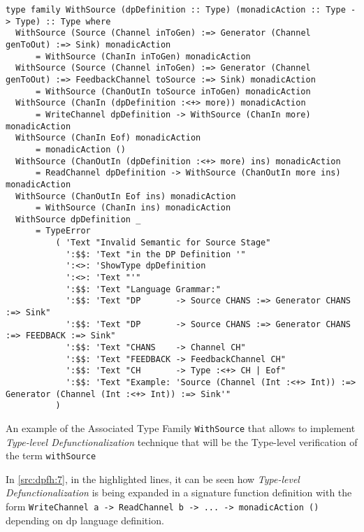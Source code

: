 \begin{listing}[H]
  \begin{verbatim}
type family WithSource (dpDefinition :: Type) (monadicAction :: Type -> Type) :: Type where
  WithSource (Source (Channel inToGen) :=> Generator (Channel genToOut) :=> Sink) monadicAction
      = WithSource (ChanIn inToGen) monadicAction
  WithSource (Source (Channel inToGen) :=> Generator (Channel genToOut) :=> FeedbackChannel toSource :=> Sink) monadicAction 
      = WithSource (ChanOutIn toSource inToGen) monadicAction
  WithSource (ChanIn (dpDefinition :<+> more)) monadicAction         
      = WriteChannel dpDefinition -> WithSource (ChanIn more) monadicAction
  WithSource (ChanIn Eof) monadicAction                              
      = monadicAction ()
  WithSource (ChanOutIn (dpDefinition :<+> more) ins) monadicAction  
      = ReadChannel dpDefinition -> WithSource (ChanOutIn more ins) monadicAction
  WithSource (ChanOutIn Eof ins) monadicAction                       
      = WithSource (ChanIn ins) monadicAction
  WithSource dpDefinition _                                          
      = TypeError
          ( 'Text "Invalid Semantic for Source Stage"
            ':$$: 'Text "in the DP Definition '"
            ':<>: 'ShowType dpDefinition
            ':<>: 'Text "'"
            ':$$: 'Text "Language Grammar:"
            ':$$: 'Text "DP       -> Source CHANS :=> Generator CHANS :=> Sink"
            ':$$: 'Text "DP       -> Source CHANS :=> Generator CHANS :=> FEEDBACK :=> Sink"
            ':$$: 'Text "CHANS    -> Channel CH"
            ':$$: 'Text "FEEDBACK -> FeedbackChannel CH"
            ':$$: 'Text "CH       -> Type :<+> CH | Eof"
            ':$$: 'Text "Example: 'Source (Channel (Int :<+> Int)) :=> Generator (Channel (Int :<+> Int)) :=> Sink'"
          )
  \end{verbatim}
  \caption[{[\texttt{Stage.hs}] WithSource Associate Type Details}]{An example of the Associated Type Family \texttt{WithSource} that allows to implement \emph{Type-level Defunctionalization} technique that will be the Type-level verification of the term \texttt{withSource}}
  \label{src:dpfh:7}
\end{listing}

In \autoref{src:dpfh:7}, in the highlighted lines, it can be seen how \emph{Type-level Defunctionalization} is being expanded in a signature function definition with the form \texttt{WriteChannel a -> ReadChannel b -> ... -> monadicAction ()} depending on \acrshort{dp} language definition. 

